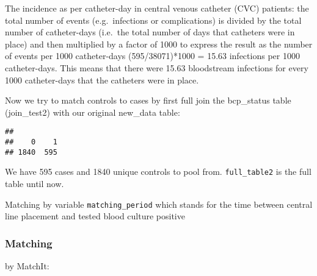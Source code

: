 \documentclass[
]{article}
\newenvironment{Shaded}{\begin{snugshade}}{\end{snugshade}}
\newcommand{\AttributeTok}[1]{\textcolor[rgb]{0.77,0.63,0.00}{#1}}
\newcommand{\DecValTok}[1]{\textcolor[rgb]{0.00,0.00,0.81}{#1}}
\newcommand{\FunctionTok}[1]{\textcolor[rgb]{0.00,0.00,0.00}{#1}}
\newcommand{\NormalTok}[1]{#1}
\newcommand{\OtherTok}[1]{\textcolor[rgb]{0.56,0.35,0.01}{#1}}
\newcommand{\SpecialCharTok}[1]{\textcolor[rgb]{0.00,0.00,0.00}{#1}}
\newcommand{\StringTok}[1]{\textcolor[rgb]{0.31,0.60,0.02}{#1}}
\begin{document}
The incidence as per catheter-day in central venous catheter (CVC)
patients: the total number of events (e.g.~infections or complications)
is divided by the total number of catheter-days (i.e.~the total number
of days that catheters were in place) and then multiplied by a factor of
1000 to express the result as the number of events per 1000
catheter-days (595/38071)*1000 = 15.63 infections per 1000
catheter-days. This means that there were 15.63 bloodstream infections
for every 1000 catheter-days that the catheters were in place.

Now we try to match controls to cases by first full join the bcp\_status
table (join\_test2) with our original new\_data table:

\begin{Shaded}
\end{Shaded}

\begin{verbatim}
## 
##    0    1 
## 1840  595
\end{verbatim}

We have 595 cases and 1840 unique controls to pool from.
\texttt{full\_table2} is the full table until now.

Matching by variable \texttt{matching\_period} which stands for the time
between central line placement and tested blood culture positive

\hypertarget{matching}{%
\subsubsection{Matching}\label{matching}}

by MatchIt:
\end{document}
